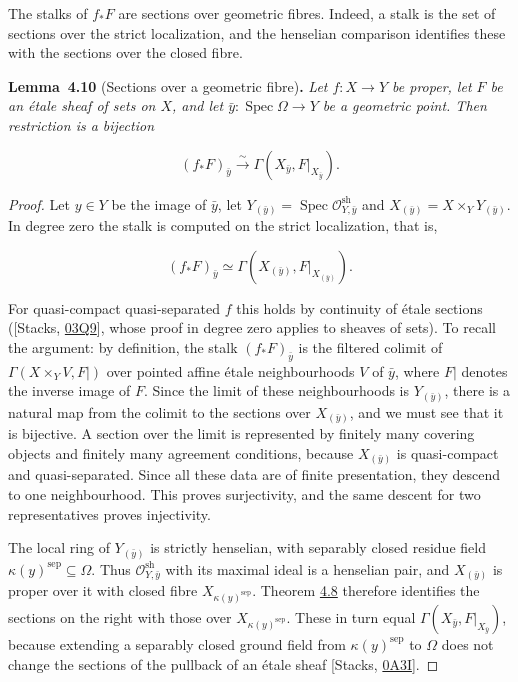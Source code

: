\documentclass[11pt]{article}
\newenvironment{bpstatement}[2]{\par\addvspace{0.6\baselineskip}\noindent\textbf{#1}#2\textbf{.}\enspace\ignorespaces}
  {\par\addvspace{0.4\baselineskip}}
\newenvironment{bpstatementit}[2]{\begin{bpstatement}{#1}{#2}\itshape\ignorespaces}{\end{bpstatement}}
\begin{document}
\label{bp27}%
The stalks of \(f_*F\) are sections over geometric fibres. Indeed, a stalk is the set of sections over the strict localization, and the henselian comparison identifies these with the sections over the closed fibre.

\label{bp28}%
\begin{bpstatementit}{Lemma~4.10}{ (Sections over a geometric fibre)}
Let \(f:X\to Y\) be proper, let \(F\) be an étale sheaf of sets on \(X\), and let \(\bar y:\operatorname{Spec}\Omega\to Y\) be a geometric point. Then restriction is a bijection

\[
(f_*F)_{\bar y}\xrightarrow{\sim}
\Gamma(X_{\bar y},F|_{X_{\bar y}}).
\tag{4.6}
\]
\end{bpstatementit}

\begin{proof}[{Proof}]\label{bp29}%
Let \(y\in Y\) be the image of \(\bar y\), let \(Y_{(\bar y)}=\operatorname{Spec}\mathcal O^{\mathrm{sh}}_{Y,\bar y}\) and \(X_{(\bar y)}=X\times_YY_{(\bar y)}\). In degree zero the stalk is computed on the strict localization, that is,

\[
(f_*F)_{\bar y}\simeq\Gamma(X_{(\bar y)},F|_{X_{(\bar y)}}).
\]

For quasi-compact quasi-separated \(f\) this holds by continuity of étale sections ([Stacks, \href{https://stacks.math.columbia.edu/tag/03Q9}{03Q9}], whose proof in degree zero applies to sheaves of sets). To recall the argument: by definition, the stalk \((f_*F)_{\bar y}\) is the filtered colimit of \(\Gamma(X\times_YV,F|)\) over pointed affine étale neighbourhoods \(V\) of \(\bar y\), where \(F|\) denotes the inverse image of \(F\). Since the limit of these neighbourhoods is \(Y_{(\bar y)}\), there is a natural map from the colimit to the sections over \(X_{(\bar y)}\), and we must see that it is bijective. A section over the limit is represented by finitely many covering objects and finitely many agreement conditions, because \(X_{(\bar y)}\) is quasi-compact and quasi-separated. Since all these data are of finite presentation, they descend to one neighbourhood. This proves surjectivity, and the same descent for two representatives proves injectivity.

The local ring of \(Y_{(\bar y)}\) is strictly henselian, with separably closed residue field \(\kappa(y)^{\mathrm{sep}}\subseteq\Omega\). Thus \(\mathcal O^{\mathrm{sh}}_{Y,\bar y}\) with its maximal ideal is a henselian pair, and \(X_{(\bar y)}\) is proper over it with closed fibre \(X_{\kappa(y)^{\mathrm{sep}}}\). Theorem \hyperref[bp24]{4.8} therefore identifies the sections on the right with those over \(X_{\kappa(y)^{\mathrm{sep}}}\). These in turn equal \(\Gamma(X_{\bar y},F|_{X_{\bar y}})\), because extending a separably closed ground field from \(\kappa(y)^{\mathrm{sep}}\) to \(\Omega\) does not change the sections of the pullback of an étale sheaf [Stacks, \href{https://stacks.math.columbia.edu/tag/0A3I}{0A3I}].
\end{proof}
\end{document}
